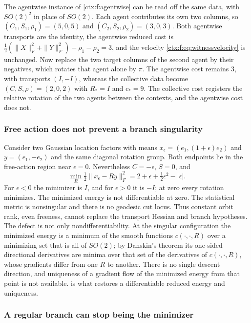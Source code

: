 The agentwise instance of \cref{ctx:f:agentwise} can be read off the same data, with $SO(2)^2$ in place of $SO(2)$. Each agent contributes its own two columns, so $(C_1,S_1,\rho_1)=(5,0,5)$ and $(C_2,S_2,\rho_2)=(3,0,3)$. Both agentwise transports are the identity, the agentwise reduced cost is $\tfrac12(\|X\|_F^2+\|Y\|_F^2)-\rho_1-\rho_2=3$, and the velocity \cref{ctx:f:eq:witnessvelocity} is unchanged. Now replace the two target columns of the second agent by their negatives, which rotates that agent alone by $\pi$. The agentwise cost remains $3$, with transports $(I,-I)$, whereas the collective data become $(C,S,\rho)=(2,0,2)$ with $R_*=I$ and $c_*=9$. The collective cost registers the relative rotation of the two agents between the contexts, and the agentwise cost does not.

\subsubsection{Free action does not prevent a branch singularity}

Consider two Gaussian location factors with means
$x_\epsilon=(e_1,(1+\epsilon)e_2)$ and $y=(e_1,-e_2)$ and the same diagonal rotation group. Both endpoints lie in the free-action region near $\epsilon=0$. Nevertheless $C=-\epsilon$, $S=0$, and
\begin{equation}
 \min_R\tfrac12\|x_\epsilon-Ry\|_F^2
 =2+\epsilon+\tfrac12\epsilon^2-|\epsilon|.
 \label{ctx:f:eq:cusp}
\end{equation}
For $\epsilon<0$ the minimizer is $I$, and for $\epsilon>0$ it is $-I$; at zero every rotation minimizes. The minimized energy is not differentiable at zero. The statistical metric is nonsingular and there is no geodesic cut locus. Thus constant orbit rank, even freeness, cannot replace the transport Hessian and branch hypotheses. The defect is not only nondifferentiability. At the singular configuration the minimized energy is a minimum of the smooth functions $c(\cdot,\cdot,R)$ over a minimizing set that is all of $SO(2)$; by Danskin's theorem its one-sided directional derivatives are minima over that set of the derivatives of $c(\cdot,\cdot,R)$, whose gradients differ from one $R$ to another. There is no single descent direction, and uniqueness of a gradient flow of the minimized energy from that point is not available.  is what restores a differentiable reduced energy and uniqueness.

\subsubsection{A regular branch can stop being the minimizer}

